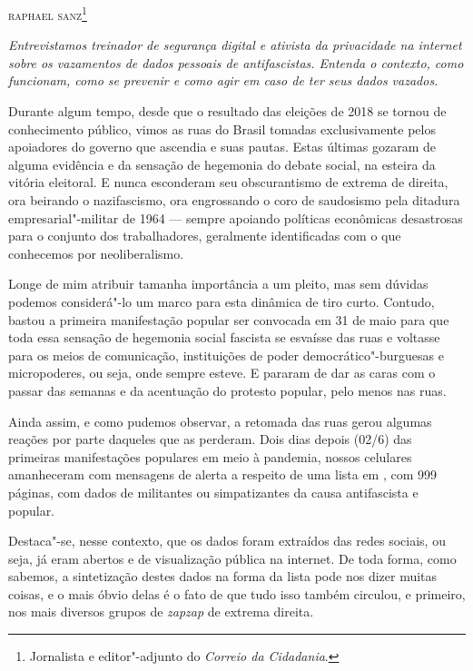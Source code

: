 \hfill{}\textsc{raphael sanz}\footnote{Jornalista e editor"-adjunto do \emph{Correio da Cidadania}.}

\bigskip

\emph{Entrevistamos treinador de segurança digital e ativista da
privacidade na internet sobre os vazamentos de dados pessoais de
antifascistas. Entenda o contexto, como funcionam, como se prevenir e
como agir em caso de ter seus dados vazados.}

Durante algum tempo, desde que o resultado das eleições de 2018 se
tornou de conhecimento público, vimos as ruas do Brasil tomadas
exclusivamente pelos apoiadores do governo que ascendia e suas pautas.
Estas últimas gozaram de alguma evidência e da sensação de hegemonia do
debate social, na esteira da vitória eleitoral. E nunca esconderam seu
obscurantismo de extrema de direita, ora beirando o nazifascismo, ora
engrossando o coro de saudosismo pela ditadura empresarial"-militar de 1964
--- sempre apoiando políticas econômicas desastrosas para o conjunto dos
trabalhadores, geralmente identificadas com o que conhecemos por
neoliberalismo.

Longe de mim atribuir tamanha importância a um pleito, mas sem dúvidas
podemos considerá"-lo um marco para esta dinâmica de tiro curto. Contudo,
bastou a primeira manifestação popular ser convocada em 31 de maio para
que toda essa sensação de hegemonia social fascista se esvaísse das ruas
e voltasse para os meios de comunicação, instituições de poder
democrático"-burguesas e micropoderes, ou seja, onde sempre esteve. E
pararam de dar as caras com o passar das semanas e da acentuação do
protesto popular, pelo menos nas ruas.

Ainda assim, e como pudemos observar, a retomada das ruas gerou algumas
reações por parte daqueles que as perderam. Dois dias depois (02/6) das
primeiras manifestações populares em meio à pandemia, nossos celulares
amanheceram com mensagens de alerta a respeito de uma lista em , com
999 páginas, com dados de militantes ou simpatizantes da causa
antifascista e popular.

Destaca"-se, nesse contexto, que os dados foram extraídos das redes
sociais, ou seja, já eram abertos e de visualização pública na internet.
De toda forma, como sabemos, a sintetização destes dados na forma da
lista pode nos dizer muitas coisas, e o mais óbvio delas é o fato de que
tudo isso também circulou, e primeiro, nos mais diversos grupos de
\emph{zapzap} de extrema direita.

